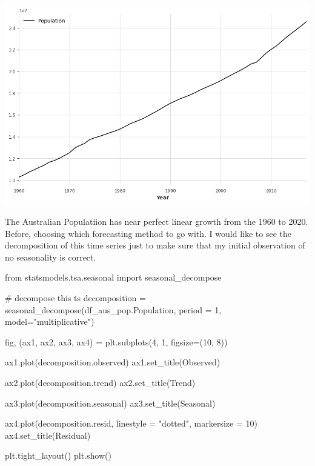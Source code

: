 \documentclass[
  11pt,
]{article}
\newenvironment{Shaded}{\begin{snugshade}}{\end{snugshade}}
\newcommand{\CommentTok}[1]{\textcolor[rgb]{0.37,0.37,0.37}{#1}}
\newcommand{\DecValTok}[1]{\textcolor[rgb]{0.68,0.00,0.00}{#1}}
\newcommand{\ImportTok}[1]{\textcolor[rgb]{0.00,0.46,0.62}{#1}}
\newcommand{\NormalTok}[1]{\textcolor[rgb]{0.00,0.23,0.31}{#1}}
\newcommand{\OperatorTok}[1]{\textcolor[rgb]{0.37,0.37,0.37}{#1}}
\newcommand{\StringTok}[1]{\textcolor[rgb]{0.13,0.47,0.30}{#1}}
\begin{document}
\includegraphics{hw3_files/figure-pdf/cell-6-output-1.png}

The Australian Populatiion has near perfect linear growth from the 1960
to 2020. Before, choosing which forecasting method to go with. I would
like to see the decomposition of this time series just to make sure that
my initial observation of no seasonality is correct.

\begin{Shaded}
\begin{Highlighting}[]
\ImportTok{from}\NormalTok{ statsmodels.tsa.seasonal }\ImportTok{import}\NormalTok{ seasonal\_decompose}

\CommentTok{\# decompose this ts }
\NormalTok{decomposition }\OperatorTok{=}\NormalTok{ seasonal\_decompose(df\_aus\_pop.Population, period }\OperatorTok{=} \DecValTok{1}\NormalTok{, model}\OperatorTok{=}\StringTok{"multiplicative"}\NormalTok{)}

\NormalTok{fig, (ax1, ax2, ax3, ax4) }\OperatorTok{=}\NormalTok{ plt.subplots(}\DecValTok{4}\NormalTok{, }\DecValTok{1}\NormalTok{, figsize}\OperatorTok{=}\NormalTok{(}\DecValTok{10}\NormalTok{, }\DecValTok{8}\NormalTok{))}

\NormalTok{ax1.plot(decomposition.observed)}
\NormalTok{ax1.set\_title(}\StringTok{\textquotesingle{}Observed\textquotesingle{}}\NormalTok{)}

\NormalTok{ax2.plot(decomposition.trend)}
\NormalTok{ax2.set\_title(}\StringTok{\textquotesingle{}Trend\textquotesingle{}}\NormalTok{)}

\NormalTok{ax3.plot(decomposition.seasonal)}
\NormalTok{ax3.set\_title(}\StringTok{\textquotesingle{}Seasonal\textquotesingle{}}\NormalTok{)}

\NormalTok{ax4.plot(decomposition.resid, linestyle }\OperatorTok{=} \StringTok{"dotted"}\NormalTok{, markersize }\OperatorTok{=} \DecValTok{10}\NormalTok{)}
\NormalTok{ax4.set\_title(}\StringTok{\textquotesingle{}Residual\textquotesingle{}}\NormalTok{)}

\NormalTok{plt.tight\_layout()}
\NormalTok{plt.show()}
\end{Highlighting}
\end{Shaded}
\end{document}
